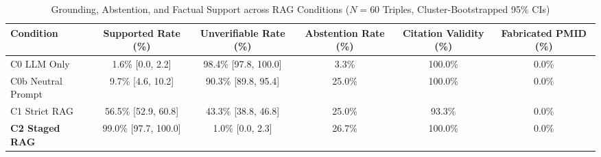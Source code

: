 \begin{table}[t]
\centering
\caption{Grounding, Abstention, and Factual Support across RAG Conditions ($N=60$ Triples, Cluster-Bootstrapped 95\% CIs)}
\label{tab:rag_comparison}
\small
\begin{tabular}{lccccc}
\hline
\textbf{Condition} & \textbf{Supported Rate (\%)} & \textbf{Unverifiable Rate (\%)} & \textbf{Abstention Rate (\%)} & \textbf{Citation Validity (\%)} & \textbf{Fabricated PMID (\%)} \\
\hline
C0 LLM Only & 1.6\% [0.0, 2.2] & 98.4\% [97.8, 100.0] & 3.3\% & 100.0\% & 0.0\% \\
C0b Neutral Prompt & 9.7\% [4.6, 10.2] & 90.3\% [89.8, 95.4] & 25.0\% & 100.0\% & 0.0\% \\
C1 Strict RAG & 56.5\% [52.9, 60.8] & 43.3\% [38.8, 46.8] & 25.0\% & 93.3\% & 0.0\% \\
\textbf{C2 Staged RAG} & 99.0\% [97.7, 100.0] & 1.0\% [0.0, 2.3] & 26.7\% & 100.0\% & 0.0\% \\
\hline
\end{tabular}
\end{table}
